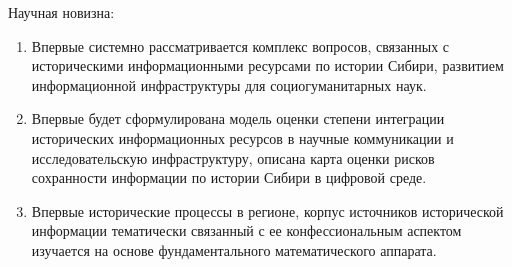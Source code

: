 Научная новизна:
\begin{enumerate}[beginpenalty=10000] %
  \item Впервые системно рассматривается комплекс вопросов, связанных с
  историческими информационными ресурсами по истории Сибири, развитием информационной инфраструктуры для социогуманитарных наук.
  \item Впервые будет сформулирована модель оценки степени интеграции
  исторических информационных ресурсов в научные коммуникации и
  исследовательскую инфраструктуру, описана карта оценки рисков сохранности информации по истории Сибири в цифровой среде.
  \item Впервые исторические процессы в регионе, корпус источников исторической информации тематически связанный с ее конфессиональным
  аспектом изучается на основе фундаментального математического аппарата.
\end{enumerate}
